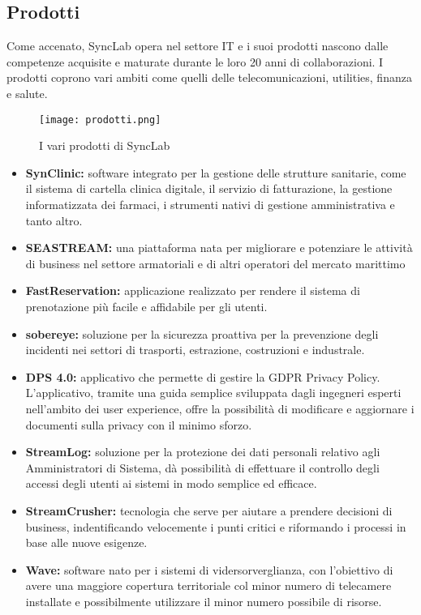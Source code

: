 \subsection{Prodotti}
Come accenato, SyncLab opera nel settore IT e i suoi prodotti nascono dalle competenze acquisite e maturate durante le loro 20 anni di collaborazioni. I prodotti coprono vari ambiti come quelli delle telecomunicazioni, utilities, finanza e salute.
\begin{figure}[H]
    \centering
    \texttt{[image: prodotti.png]}
    \caption{I vari prodotti di SyncLab}
\end{figure}
\begin{itemize}
    \item \textbf{SynClinic:} software integrato per la gestione delle strutture sanitarie, come il sistema di cartella clinica digitale, il servizio di fatturazione, la gestione informatizzata dei farmaci, i strumenti nativi di gestione amministrativa e tanto altro.
    \item \textbf{SEASTREAM:} una piattaforma nata per migliorare e potenziare le attività di business nel settore armatoriali e di altri operatori del mercato marittimo
    \item \textbf{FastReservation:} applicazione realizzato per rendere il sistema di prenotazione più facile e affidabile per gli utenti.
    \item \textbf{sobereye:} soluzione per la sicurezza proattiva per la prevenzione degli incidenti nei settori di trasporti, estrazione, costruzioni e industrale.
    \item \textbf{DPS 4.0:} applicativo che permette di gestire la GDPR Privacy Policy. L'applicativo, tramite una guida semplice sviluppata dagli ingegneri esperti nell'ambito dei user experience, offre la possibilità di modificare e aggiornare i documenti sulla privacy con il minimo sforzo.
    \item \textbf{StreamLog:} soluzione per la protezione dei dati personali relativo agli Amministratori di Sistema, dà possibilità di effettuare il controllo degli accessi degli utenti ai sistemi in modo semplice ed efficace.
    \item \textbf{StreamCrusher:} tecnologia che serve per aiutare a prendere decisioni di business, indentificando velocemente i punti critici e riformando i processi in base alle nuove esigenze.
    \item \textbf{Wave:} software nato per i sistemi di vidersorverglianza, con l'obiettivo di avere una maggiore copertura territoriale col minor numero di telecamere installate e possibilmente utilizzare il minor numero possibile di risorse.
\end{itemize}


